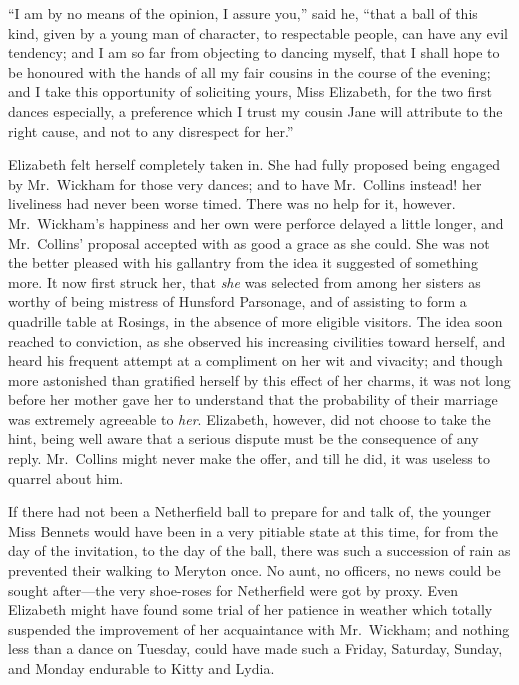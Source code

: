 \documentclass[12pt,english,oneside]{book}
\begin{document}
{}``I am by no means of the opinion, I assure you,'' said he, {}``that
a ball of this kind, given by a young man of character, to respectable
people, can have any evil tendency; and I am so far from objecting
to dancing myself, that I shall hope to be honoured with the hands
of all my fair cousins in the course of the evening; and I take this
opportunity of soliciting yours, Miss Elizabeth, for the two first
dances especially, a preference which I trust my cousin Jane will
attribute to the right cause, and not to any disrespect for her.''

Elizabeth felt herself completely taken in. She had fully proposed
being engaged by Mr.\ Wickham for those very dances; and to have
Mr.\ Collins instead! her liveliness had never been worse timed.
There was no help for it, however. Mr.\ Wickham's happiness and her
own were perforce delayed a little longer, and Mr.\ Collins' proposal
accepted with as good a grace as she could. She was not the better
pleased with his gallantry from the idea it suggested of something
more. It now first struck her, that \textit{she} was selected from
among her sisters as worthy of being mistress of Hunsford Parsonage,
and of assisting to form a quadrille table at Rosings, in the absence
of more eligible visitors. The idea soon reached to conviction, as
she observed his increasing civilities toward herself, and heard his
frequent attempt at a compliment on her wit and vivacity; and though
more astonished than gratified herself by this effect of her charms,
it was not long before her mother gave her to understand that the
probability of their marriage was extremely agreeable to \textit{her}.
Elizabeth, however, did not choose to take the hint, being well aware
that a serious dispute must be the consequence of any reply. Mr.\ Collins
might never make the offer, and till he did, it was useless to quarrel
about him.

If there had not been a Netherfield ball to prepare for and talk of,
the younger Miss Bennets would have been in a very pitiable state
at this time, for from the day of the invitation, to the day of the
ball, there was such a succession of rain as prevented their walking
to Meryton once. No aunt, no officers, no news could be sought after\mbox{---}the
very shoe-roses for Netherfield were got by proxy. Even Elizabeth
might have found some trial of her patience in weather which totally
suspended the improvement of her acquaintance with Mr.\ Wickham;
and nothing less than a dance on Tuesday, could have made such a Friday,
Saturday, Sunday, and Monday endurable to Kitty and Lydia.
\end{document}
